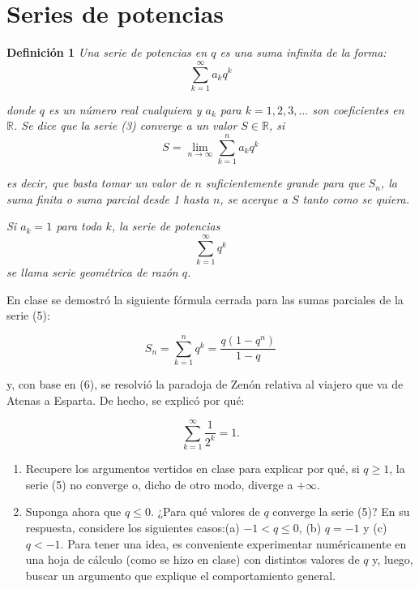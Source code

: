 \documentclass[12pt]{article}
\begin{document}
\section{Series de potencias}

{\bf Definición 1} \textit{Una serie de potencias en $q$ es una suma infinita de la forma:}\[\sum_{k=1}^{\infty} a_k q^k \tag{3}\]

\textit{donde $q$ es un número real cualquiera y $a_k$ para $k = 1, 2, 3, \dots$ son coeficientes en $\mathbb{R}$. Se dice que la serie (3) converge a un valor $S \in \mathbb{R}$, si}\[S = \lim_{n \to \infty} \sum_{k=1}^{n} a_k q^k \tag{4}\]

\textit{es decir, que basta tomar un valor de $n$ suficientemente grande para que $S_n$, la suma finita o suma parcial desde 1 hasta $n$, se acerque a $S$ tanto como se quiera.}

\textit{Si $a_k = 1$ para toda $k$, la serie de potencias}
\[\sum_{k=1}^{\infty} q^k \tag{5}\]
\textit{se llama serie geométrica de razón $q$.}


En clase se demostró la siguiente fórmula cerrada para las sumas parciales de la serie (5):

\[
S_n = \sum_{k=1}^{n} q^k = \frac{q (1 - q^n)}{1 - q} \tag{6}
\]

y, con base en (6), se resolvió la paradoja de Zenón relativa al viajero que va de Atenas a Esparta. De hecho, se explicó por qué:

\[
\sum_{k=1}^{\infty} \frac{1}{2^k} = 1.
\]

\begin{enumerate}
    \item Recupere los argumentos vertidos en clase para explicar por qué, si $q \geq 1$, la serie (5) no converge o, dicho de otro modo, diverge a $+\infty$.
    
    \item Suponga ahora que $q \leq 0$. ¿Para qué valores de $q$ converge la serie (5)? En su respuesta, considere los siguientes casos:(a) $-1 < q \leq 0$, (b) $q = -1$ y (c)$q < -1$. Para tener una idea, es conveniente experimentar numéricamente en una hoja de cálculo (como se hizo en clase) con distintos valores de $q$ y, luego, buscar un argumento que explique el comportamiento general.
\end{enumerate}
\end{document}
